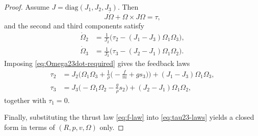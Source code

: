 \documentclass[10pt,a4paper]{amsart}
\begin{document}
\begin{proof}
Assume $J=\mathrm{diag}(J_1,J_2,J_3)$. Then
\[
J\dot\Omega+\Omega\times J\Omega=\tau,
\]
and the second and third components satisfy
\begin{align*}
\dot\Omega_2&=\frac{1}{J_2}\Big(\tau_2-(J_1-J_3)\Omega_1\Omega_3\Big),\\
\dot\Omega_3&=\frac{1}{J_3}\Big(\tau_3-(J_2-J_1)\Omega_1\Omega_2\Big).
\end{align*}
Imposing \eqref{eq:Omega23dot-required} gives the feedback laws
\begin{equation}
{\begin{aligned}
\tau_2 &= J_2\Big(\Omega_1\Omega_3 + \frac{1}{\rho}\Big(-\frac{f}{m}+g s_3\Big)\Big)+(J_1-J_3)\Omega_1\Omega_3,\\
\tau_3 &= J_3\Big(-\Omega_1\Omega_2 - \frac{g}{\rho}s_2\Big)+(J_2-J_1)\Omega_1\Omega_2,
\end{aligned}}
\end{equation}
together with $\tau_1=0$.

Finally, substituting the thrust law \eqref{eq:f-law} into \eqref{eq:tau23-laws} yields a closed form in terms of $(R,p,v,\Omega)$ only. 
\end{proof}
\end{document}
